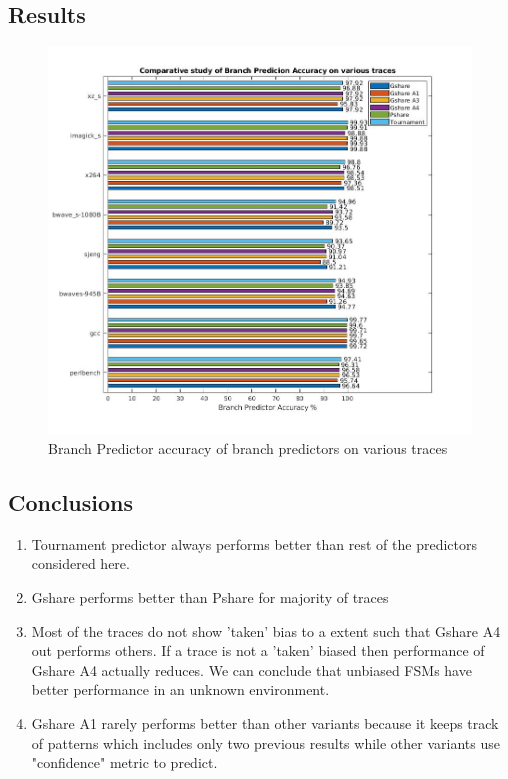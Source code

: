 \documentclass[a4paper]{article}
\begin{document}
    \subsection{Results}
        \begin{figure}[ht]
            \centerline{\includegraphics[width= \linewidth]{images/veerendra/final_accuracy}}
            \caption{Branch Predictor accuracy of branch predictors on various traces}
            \label{fig_branch_predictor_accuracy}
        \end{figure}
    
    \subsection{Conclusions}
        \begin{enumerate}
            \item  Tournament predictor always performs better than rest of the predictors considered here.
            \item Gshare performs better than Pshare for majority of traces
            \item Most of the traces do not show 'taken' bias to a extent such that Gshare A4 out performs others. If a trace is not a 'taken' biased then performance of Gshare A4 actually reduces. We can conclude that unbiased FSMs have better performance in an unknown environment.
            \item Gshare A1 rarely performs better than other variants because it keeps track of patterns which includes only two previous results while other variants use "confidence" metric to predict.
            
        \end{enumerate}
\end{document}
